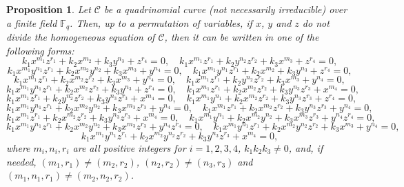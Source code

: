 \documentclass[preprint,12pt]{elsarticle}
\newtheorem{proposition}[theorem]{Proposition}
\begin{document}
\begin{proposition}
Let $\mathcal{C}$ be a quadrinomial curve (not necessarily irreducible) over a finite field $\mathbb{F}_q$. Then, up to a permutation of variables, if $x$, $y$ and $z$ do not divide the homogeneous equation of $\mathcal{C}$, then it can be written in one of the following forms:
$$k_1x^{m_1}z^{r_1} + k_2x^{m_2} + k_3y^{n_3} + z^{r_4} = 0, \quad k_1x^{m_1}z^{r_1} + k_2y^{n_2}z^{r_2} + k_3x^{m_3} + z^{r_4} = 0,$$
$$k_1x^{m_1}y^{n_1}z^{r_1} + k_2x^{m_2}y^{n_2} + k_3x^{m_3} + y^{n_4} = 0, \quad k_1x^{m_1}y^{n_1}z^{r_1} + k_2x^{m_2} + k_3y^{n_3} + z^{r_4} = 0,$$
$$k_1x^{m_1}z^{r_1} + k_2x^{m_2}z^{r_2} + k_3x^{m_3} + y^{n_4} = 0, \quad k_1x^{m_1}z^{r_1} + k_2y^{n_2}z^{r_2} + k_3x^{m_3} + y^{n_4} = 0,$$
$$k_1x^{m_1}y^{n_1}z^{r_1} + k_2x^{m_2}z^{r_2} + k_3y^{n_3} + z^{r_4} = 0, \quad k_1x^{m_1}z^{r_1} + k_2x^{m_2}z^{r_2} + k_3y^{n_3}z^{r_3} + x^{m_4} = 0,$$
$$k_1x^{m_1}z^{r_1} + k_2y^{n_2}z^{r_2} + k_3y^{n_3}z^{r_3} + x^{m_4} = 0, \quad k_1x^{m_1}y^{n_1} + k_2x^{m_2}z^{r_2} + k_3y^{n_3}z^{r_3} + z^{r_4} = 0,$$
$$k_1x^{m_1}y^{n_1}z^{r_1} + k_2x^{m_2}y^{n_2} + k_3x^{m_3}z^{r_3} + y^{n_4} = 0, \quad k_1x^{m_1}z^{r_1} + k_2x^{m_2}z^{r_2} + k_3y^{n_3}z^{r_3} + y^{n_4} = 0,$$
$$k_1x^{m_1}z^{r_1} + k_2x^{m_2}z^{r_2} + k_3y^{n_3}z^{r_3} + x^{m_4} = 0, \quad k_1x^{m_1}y^{n_1} + k_2x^{m_2}y^{n_2} + k_3x^{m_3}z^{r_3} + y^{n_4}z^{r_4} = 0,$$
$$k_1x^{m_1}y^{n_1}z^{r_1} + k_2x^{m_2}y^{n_2} + k_3x^{m_3}z^{r_3} + y^{n_4}z^{r_4} = 0, \quad k_1x^{m_1}y^{n_1}z^{r_1} + k_2x^{m_2}y^{n_2}z^{r_2} + k_3x^{m_3} + y^{n_4} = 0,$$
$$k_1x^{m_1}y^{n_1}z^{r_1} + k_2x^{m_2}y^{n_2}z^{r_2} + k_3y^{n_3}z^{r_3} + x^{m_4} = 0,$$
where $m_i, n_i, r_i$ are all positive integers for $i = 1,2,3,4$, $k_1k_2k_3 \neq 0$, and, if needed, $(m_1,r_1) \neq (m_2,r_2)$, $(n_2,r_2) \neq (n_3,r_3)$ and $(m_1,n_1,r_1) \neq (m_2,n_2,r_2)$.
\end{proposition}
\end{document}
